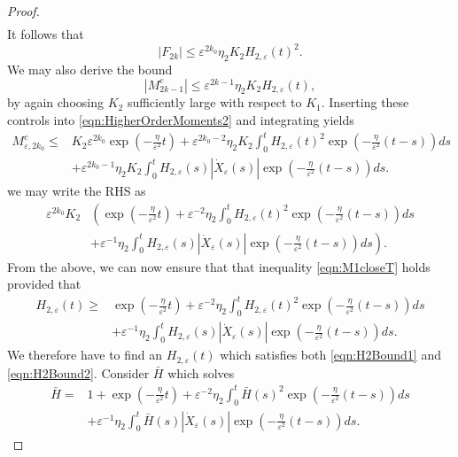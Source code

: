 \documentclass[]{article}
\theoremstyle{remark}
\begin{document}
\begin{proof}
\begin{align*}
\end{align*}
It follows that
\[|F_{2k}|\leq{}\varepsilon^{2k_0}\eta_{2}K_2H_{2,\varepsilon}(t)^2.\]
We may also derive the bound
\[|M^{c}_{2k-1}|\leq{}\varepsilon ^{2k-1}\eta_2{}K_2H_{2,\varepsilon}(t),\]
by again choosing $K_2$ sufficiently large with respect to $K_1$. 
Inserting these controls into \eqref{eqn:HigherOrderMoments2} and integrating yields
\begin{align*}
M_{\varepsilon,2k_0}^c\leq{}&K_2\varepsilon^{2k_0}\exp\left(-\frac{\eta}{\varepsilon^2}t\right)+\varepsilon^{2k_0-2}\eta_2K_{2}\int_{0}^{t}H_{2,\varepsilon}(t)^2\exp\left(-\frac{\eta}{\varepsilon^2}(t-s)\right)ds\\
    &+\varepsilon^{2k_0-1}\eta_2K_2\int_{0}^{t}H_{2,\varepsilon}(s)|\dot{X}_{\varepsilon}(s)|\exp\left(-\frac{\eta}{\varepsilon^2}(t-s)\right)ds.
\end{align*}
we may write the RHS as 
\begin{align*}
\varepsilon^{2k_0}K_2&\left(\exp\left(-\frac{\eta}{\varepsilon^2}t\right)+\varepsilon^{-2}\eta_2\int_{0}^{t}H_{2,\varepsilon}(t)^2\exp\left(-\frac{\eta}{\varepsilon^2}(t-s)\right)ds\right.\\
&\left.+\varepsilon^{-1}\eta_2\int_{0}^{t}H_{2,\varepsilon}(s)|\dot{X}_{\varepsilon}(s)|\exp\left(-\frac{\eta}{\varepsilon^2}(t-s)\right)ds\right).
\end{align*}
From the above, we can now ensure that that inequality \eqref{eqn:M1closeT} holds provided that
\begin{align}\label{eqn:H2Bound2}
H_{2,\varepsilon}(t)\geq{}&\exp\left(-\frac{\eta}{\varepsilon^2}t\right)+\varepsilon^{-2}\eta_2\int_{0}^{t}H_{2,\varepsilon}(t)^2\exp\left(-\frac{\eta}{\varepsilon^2}(t-s)\right)ds\\
&+\varepsilon^{-1}\eta_2\int_{0}^{t}H_{2,\varepsilon}(s)|\dot{X}_{\varepsilon}(s)|\exp\left(-\frac{\eta}{\varepsilon^2}(t-s)\right)ds.\nonumber
\end{align}
We therefore have to find an $H_{2,\varepsilon}(t)$ which satisfies both \eqref{eqn:H2Bound1} and \eqref{eqn:H2Bound2}. Consider $\bar{H}$ which solves
\begin{align}\label{eqn:BarH}
\bar{H}=&1+\exp\left(-\frac{\eta}{\varepsilon^2}t\right)+\varepsilon^{-2}\eta_2\int_{0}^{t}\bar{H}(s)^2\exp\left(-\frac{\eta}{\varepsilon^2}(t-s)\right)ds\\
&+\varepsilon^{-1}\eta_2\int_{0}^{t}\bar{H}(s)|\dot{X}_{\varepsilon}(s)|\exp\left(-\frac{\eta}{\varepsilon^2}(t-s)\right)ds.\nonumber
\end{align}

\end{proof}
\end{document}
